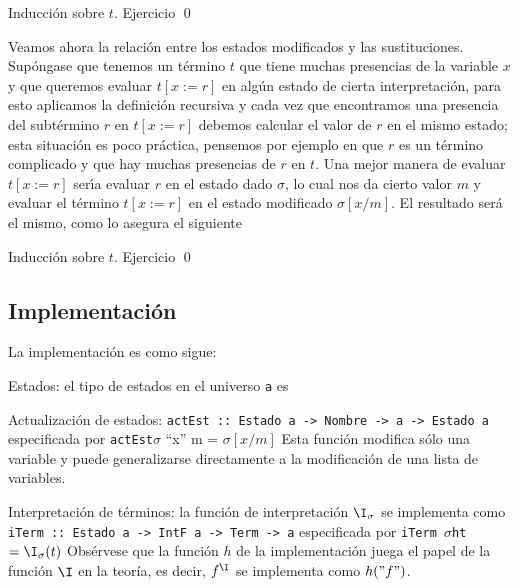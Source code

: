 \documentclass[11pt,letterpaper]{article}
\begin{document}


\proof Inducción sobre $t$. Ejercicio \qed

\newpage

Veamos ahora la relación entre los estados modificados y las sustituciones. Sup\'ongase que tenemos un t\'ermino $t$ que tiene muchas presencias de la
variable $x$ y que queremos evaluar $t[x:=r]$ en alg\'un estado de cierta
interpretaci\'on, para esto aplicamos la definici\'on recursiva y cada vez
que encontramos una presencia del subt\'ermino $r$ en $t[x:=r]$
debemos calcular el valor de $r$ en el mismo estado; esta situaci\'on es
poco pr\'actica, pensemos por ejemplo en que $r$ es un t\'ermino complicado
y que hay muchas presencias de $r$ en $t$. Una mejor manera de evaluar
$t[x:=r]$ ser\'{\i}a evaluar $r$ en el estado dado $\sigma$, lo cual nos da cierto
valor $m$ y evaluar el t\'ermino $t[x:=r]$ en el estado modificado
$\sigma[x/m]$. El resultado ser\'a el mismo, como lo asegura el siguiente


\proof Inducción sobre $t$. Ejercicio \qed


\subsection{Implementación}

La implementación es como sigue:

\bi
\item Estados: el tipo de estados en el universo {\tt a} es 
\ec
\item Actualización de estados:
\bc
{\tt actEst :: Estado a -> Nombre -> a -> Estado a}
\ec
especificada por
\bc
{\tt actEst}\;$\sigma$ \enquote{x} m = $\sigma[x/m]$
\ec
Esta función modifica sólo una variable y puede generalizarse directamente a la modificación de una lista de variables.

\item Interpretación de términos: la función de interpretación $\I_\sigma$ se implementa como
\bc
{\tt iTerm :: Estado a -> IntF a -> Term -> a}
\ec
especificada por
\bc
{\tt iTerm $\sigma$\;h\;t} $= \I_\sigma(t)$
\ec
Obsérvese que la función $h$ de la implementación juega el papel de la función $\I$ en la teoría, es decir, $f^\I$ se implementa como $h("f")$.
\ei
\end{document}
